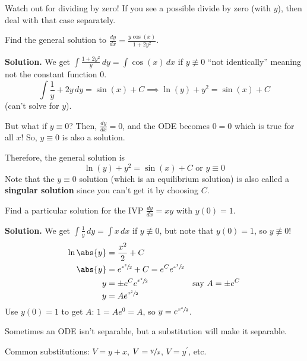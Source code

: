 \begin{Remark}{}{}
    Watch out for dividing by zero! If you see a possible divide
    by zero (with $ y $), then deal with that case separately.
\end{Remark}

\begin{Example}{}{}
    Find the general solution to
    $ \displaystyle  \frac{dy}{dx}=\frac{y\cos(x)}{1+2y^2} $.

    \textbf{Solution.} We get
    $ \displaystyle  \int \frac{1+2y^2}{y} \, d{y} =\int \cos(x)\, d{x} $
    if $ y\not\equiv 0 $ ``not identically'' meaning not the constant function $ 0 $.
    \[ \int \frac{1}{y} +2y\, d{y} =\sin(x)+C\implies \ln(y)+y^2=\sin(x)+C \]
    (can't solve for $ y $).

    But what if $ y\equiv 0 $? Then, $ \displaystyle \frac{dy}{dx} =0 $, and the ODE becomes
    $ 0=0 $ which is true for all $ x $! So, $ y\equiv 0 $ is also a solution.

    Therefore, the general solution is
    \[ \ln(y)+y^2=\sin(x)+C \text{ or }y\equiv 0 \]
    Note that the $ y\equiv 0 $ solution (which is an equilibrium solution) is also
    called a \textbf{singular solution} since you can't get it by choosing $ C $.
\end{Example}

\begin{Example}{}{}
    Find a particular solution for the IVP
    $ \displaystyle  \frac{dy}{dx} =xy $
    with $ y(0)=1 $.

    \textbf{Solution.} We get
    $ \displaystyle  \int \frac{1}{y} \, d{y} =\int x\, d{x} $
    if $ y\not\equiv 0 $, but note that $ y(0)=1 $, so $ y\not\equiv 0 $!
    \begin{align*}
        \ln\abs{y} & =\frac{x^2}{2} +C                                                    \\
        \abs{y}    & =e^{\sfrac{x^2}{2}}+C=e^C e^{\sfrac{x^2}{2}}                         \\
        y          & =\pm e^C e^{\sfrac{x^2}{2}}                  & \text{say } A=\pm e^C \\
        y          & =Ae^{\sfrac{x^2}{2}}
    \end{align*}
    Use $ y(0)=1 $ to get $ A $: $ 1=Ae^0=A $, so $ y=e^{\sfrac{x^2}{2}} $.
\end{Example}

Sometimes an ODE isn't separable, but a substitution will make it separable.

Common substitutions: $ V=y+x $, $ V=\sfrac{y}{x} $, $ V=y^\prime $, etc.

